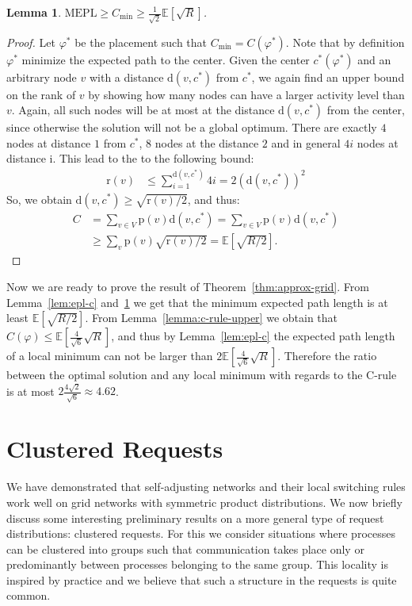 \documentclass[conference]{IEEEtran}
\def\E{\mathbb{E}}
\def\d{\mathrm{d}}
\def\p{\mathrm{p}}
\def\r{\mathrm{r}}
\def\mepl{\mathrm{MEPL}}
\newtheorem{lemma}{Lemma}
\begin{document}
\begin{lemma}\label{lem:c-rule-lower}
$\mepl \ge C_{\min} \ge \frac{1}{\sqrt{2}}\E[\sqrt{R}]$.
\end{lemma}
\begin{proof}
Let $\varphi^*$ be the placement  such that $C_{\min} = C(\varphi^*)$. Note that by definition $\varphi^*$ minimize the expected path to the center. Given the center $c^*(\varphi^*)$ and an arbitrary node $v$ with a distance $\d(v,c^*)$ from $c^*$, we again find an upper bound on the rank of $v$ by showing how many nodes can have a larger activity level than $v$. Again, all such nodes will be at most at the distance $\d(v,c^*)$ from the center, since otherwise the solution will not be a global optimum. There are exactly $4$ nodes at distance $1$ from $c^*$, $8$ nodes at the distance $2$ and in general $4i$ nodes at distance i. This lead to the to the following bound:
\begin{align*}
\r(v)&\le\sum_{i=1}^{\d(v,c^*)} 4i=2(\d(v,c^*))^2
\end{align*}
So, we obtain $\d(v,c^*)\ge\sqrt{\r(v)/2}$, and thus:\\
\begin{align*}
C&=\sum_{v\in V}\p(v)\d(v,c^*)=\sum_{v\in V}\p(v) \d(v,c^*)\\
&\ge\sum_{v}\p(v) \sqrt{\r(v)/2}=\E[\sqrt{R/2}].
\end{align*}
\end{proof}

Now we are ready to prove the result of Theorem~\ref{thm:approx-grid}. From Lemma~\ref{lem:epl-c} and~\ref{lem:c-rule-lower} we get that the minimum expected path length is at least $\E[\sqrt{R/2}]$. From Lemma~\ref{lemma:c-rule-upper} we obtain that $C(\varphi) \le \E[\frac{4}{\sqrt{6}} \sqrt{R}]$, and thus by Lemma~\ref{lem:epl-c} the expected path length of a local minimum can not be larger than $2\E[\frac{4}{\sqrt{6}} \sqrt{R}]$. Therefore the ratio between the optimal solution and any local minimum with regards to the C-rule is at most $2 \frac{4\sqrt{2}}{\sqrt{6}} \approx 4.62$.








\section{Clustered Requests} \label{sec:cluster}

We have demonstrated that self-adjusting networks and their local switching rules work well on grid networks with symmetric product distributions. We now briefly discuss some interesting preliminary results on a more general type of request distributions: clustered requests. For this we consider situations where processes can be clustered into groups such that communication takes place only or predominantly between processes belonging to the same group. This locality is inspired by practice and we believe that such a structure in the requests is quite common.
\end{document}
